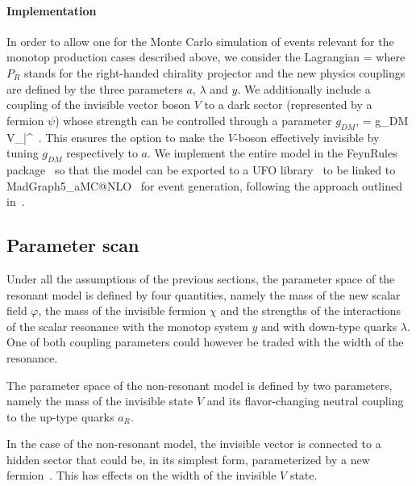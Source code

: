 \paragraph{Implementation}
     In order to allow one for the Monte Carlo simulation of events relevant for
     the monotop production cases described above, we consider the Lagrangian
     \be
       \lag =
     \ee
     where $P_R$ stands for the right-handed chirality projector and the new
     physics couplings are defined by the three parameters $a$, $\lambda$ and
     $y$. We additionally include a coupling of the invisible vector boson $V$
     to a dark sector (represented by a fermion $\psi$) whose strength can be
     controlled through a parameter $g_{DM}$,
     \be
       \lag = g_{DM} V_\mu \bar\psi \gamma^\mu\psi \ .
     \ee
     This ensures the option to make the $V$-boson effectively invisible by
     tuning $g_{DM}$ respectively to $a$. We implement the entire model in the
     {\sc FeynRules} package~\cite{Alloul:2013bka} so that the model can be
     exported to a UFO library~\cite{Degrande:2011ua} to be linked to
     {\sc MadGraph5\_aMC@NLO}~\cite{Alwall:2014hca} for event generation,
     following the approach outlined in~\cite{Christensen:2009jx}.


\subsection{Parameter scan}

Under all the assumptions of the previous sections, the parameter space of
the resonant model is defined by four quantities, namely the mass of the
new scalar field $\varphi$, the mass of the invisible fermion $\chi$ and
the strengths of the interactions of the scalar resonance with the monotop
system $y$ and with down-type quarks $\lambda$. One of both coupling
parameters could however be traded with the width of the resonance.

The parameter space of the non-resonant model is defined by two
parameters, namely the mass of the invisible state $V$ and its
flavor-changing neutral coupling to the up-type quarks $a_R$.

In the case of the non-resonant model, the invisible vector is connected to
a hidden sector that could be, in its simplest form, parameterized by a new
fermion~\cite{Boucheneb:2014wza}. This has effects on the width of the invisible $V$ state.


